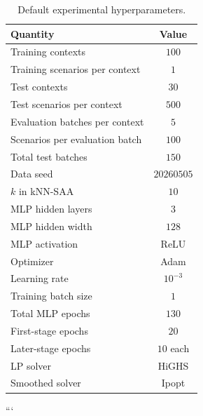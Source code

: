 \begin{table}[h]
\centering
\small
\begin{tabular}{lc}
\toprule
Quantity & Value \\
\midrule
Training contexts & $100$ \\
Training scenarios per context & $1$ \\
Test contexts & $30$ \\
Test scenarios per context & $500$ \\
Evaluation batches per context & $5$ \\
Scenarios per evaluation batch & $100$ \\
Total test batches & $150$ \\
Data seed & $20260505$ \\
$k$ in kNN-SAA & $10$ \\
MLP hidden layers & $3$ \\
MLP hidden width & $128$ \\
MLP activation & ReLU \\
Optimizer & Adam \\
Learning rate & $10^{-3}$ \\
Training batch size & $1$ \\
Total MLP epochs & $130$ \\
First-stage epochs & $20$ \\
Later-stage epochs & $10$ each \\
LP solver & HiGHS \\
Smoothed solver & Ipopt \\
\bottomrule
\end{tabular}
\caption{Default experimental hyperparameters.}
\label{tab:default_hyperparameters}
\end{table}
```
